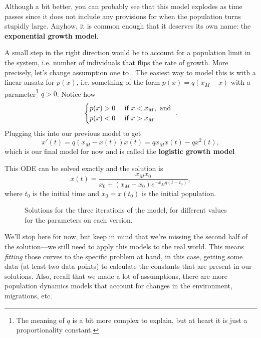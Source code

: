 Although a bit better, you can probably see that this model explodes as time
passes since it does not include any provisions for when the population turns
stupidly large. Anyhow, it is common enough that it deserves its own name: the
\textbf{exponential growth model}.

A small step in the right direction would be to account for a population limit
in the system, i.e. number of individuals that flips the rate of growth. More
precisely, let's change assumption one to . The easiest way to model this is
with a linear ansatz for $p(x)$, i.e. something of the form $p(x) = q(x_M - x)$
with a parameter\footnote{The meaning of $q$ is a bit more complex to explain,
but at heart it is just a proportionality constant.} $q > 0$. Notice how
\[
  \begin{cases}
    p(x) > 0 &\text{ if } x < x_M,\text{ and } \\
    p(x) < 0 &\text{ if } x > x_M
  \end{cases}
  .
\]
Plugging this into our previous model to get
\[
  x'(t) = q(x_M - x(t))x(t) = q x_M x(t) - q x^2(t),
\]
which is our final model for now and is called the
\textbf{logistic growth model}

This ODE can be solved exactly and the solution is
\[
  x(t) = \frac{x_M x_0}{x_0 + (x_M - x_0) e^{- x_M q (t - t_0)}},
\]
where $t_0$ is the initial time and $x_0 = x(t_0)$ is the initial population.


\begin{figure}
  [h]

  \caption{Solutions for the three iterations of the model, for different
  values for the parameters on each version.}
\end{figure}

We'll stop here for now, but keep in mind that we're missing the second half of
the solution---we still need to apply this models to the real world. This means
\textit{fitting} those curves to the specific problem at hand, in this case,
getting some data (at least two data points) to calculate the constants that
are present in our solutions. Also, recall that we made a lot of assumptions,
there are more population dynamics models that account for changes in the
environment, migrations, etc.



